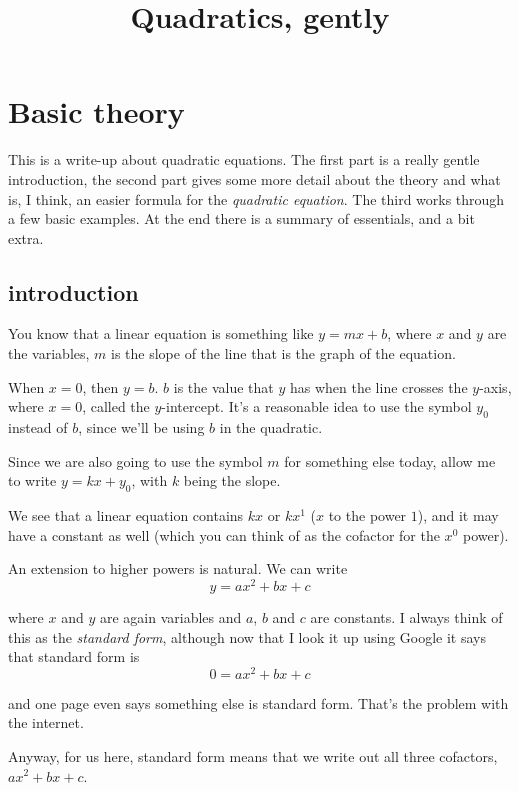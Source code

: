 \documentclass[11pt, oneside]{article}
\title{Quadratics, gently}
\date{}
\begin{document}
\maketitle
\Large


\section*{Basic theory}

This is a write-up about quadratic equations.  The first part is a really gentle introduction, the second part gives some more detail about the theory and what is, I think, an easier formula for the \emph{quadratic equation}.  The third works through a few basic examples.  At the end there is a summary of essentials, and a bit extra.

\subsection*{introduction}

You know that a linear equation is something like $y = mx + b$, where $x$ and $y$ are the variables, $m$ is the slope of the line that is the graph of the equation. 

When  $x = 0$, then $y = b$.  $b$ is the value that $y$ has when the line crosses the $y$-axis, where $x = 0$, called the $y$-intercept.  It's a reasonable idea to use the symbol $y_0$ instead of $b$, since we'll be using $b$ in the quadratic.

Since we are also going to use the symbol $m$ for something else today, allow me to write $y = kx + y_0$, with $k$ being the slope.

We see that a linear equation contains $kx$ or $kx^1$ ($x$ to the power $1$), and it may have a constant as well (which you can think of as the cofactor for the $x^0$ power).

An extension to higher powers is natural.  We can write
\[ y = ax^2 + bx + c \]

where $x$ and $y$ are again variables and $a$, $b$ and $c$ are constants.  I always think of this as the \emph{standard form}, although now that I look it up using Google it says that standard form is
\[ 0 = ax^2 + bx + c \]

and one page even says something else is standard form.  That's the problem with the internet.

Anyway, for us here, standard form means that we write out all three cofactors, $ax^2 + bx + c$.
\end{document}
